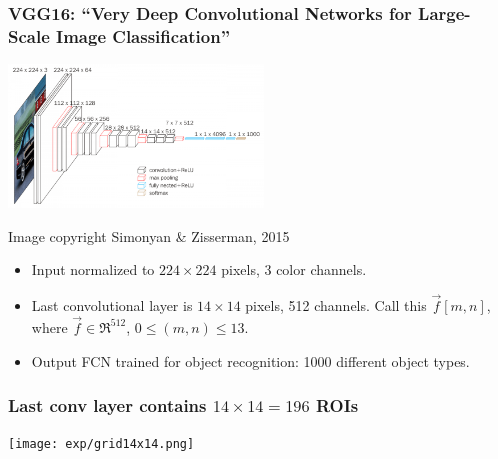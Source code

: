 \documentclass{beamer}
\begin{document}
\begin{frame}
  \frametitle{VGG16: ``Very Deep Convolutional Networks for Large-Scale Image Classification''}
  \centerline{\includegraphics[height=1.5in]{figs/vgg16.png}}
  \begin{tiny}Image copyright Simonyan \& Zisserman, 2015\end{tiny}  
  \begin{itemize}
  \item Input normalized to $224\times 224$ pixels, 3 color channels.
  \item Last convolutional layer is $14\times 14$ pixels, 512 channels.  Call this
    $\vec{f}[m,n]$, where $\vec{f}\in\Re^{512}$, $0\le (m,n)\le 13$.
  \item Output FCN trained for object recognition: 1000 different object types.
  \end{itemize}
\end{frame}



\begin{frame}
  \frametitle{Last conv layer contains $14\times 14=196$ ROIs}
  \centerline{\texttt{[image: exp/grid14x14.png]}}
\end{frame}
\end{document}

